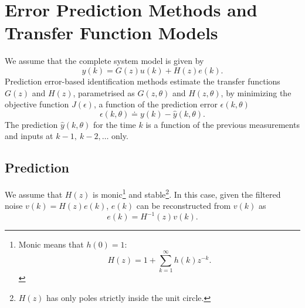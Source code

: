 \chapter{Error Prediction Methods and Transfer Function Models}
\label{chap:error-prediction-methods-tf}

We assume that the complete system model is given by
\begin{equation}
  \label{eq:PEM-tf-models}
  y(k) = G(z)u(k) + H(z)e(k).
\end{equation}
Prediction error-based identification methods estimate the transfer functions $G(z)$ and $H(z)$, parametrised as $G(z,\theta)$ and $H(z,\theta)$, by minimizing the objective function $J(\epsilon)$, a function of the prediction error $\epsilon(k,\theta)$
\begin{equation*}
  \epsilon(k,\theta) \doteq y(k) - \hat{y}(k,\theta).
\end{equation*}
The prediction $\hat{y}(k,\theta)$ for the time $k$ is a function of the previous measurements and inputs at $k-1,\ k-2,\ldots$ only.

\section{Prediction}
\label{sec:prediction}

We assume that $H(z)$ is monic\footnote{Monic means that $h(0)=1$:
\begin{equation*}
  H(z) = 1 + \sum_{k=1}^\infty h(k)z^{-k}.
\end{equation*}} and stable\footnote{$H(z)$ has only poles strictly inside the unit circle.}. In this case, given the filtered noise $v(k)=H(z)e(k)$, $e(k)$ can be reconstructed from $v(k)$ as
\begin{equation}
  \label{eq:noise-reconstruction}
  e(k) = H^{-1}(z)v(k).
\end{equation}

